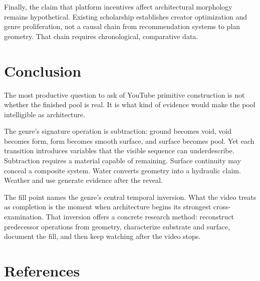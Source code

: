 \documentclass[11pt]{article}
\begin{document}
Finally, the claim that platform incentives affect architectural morphology remains hypothetical. Existing scholarship establishes creator optimization and genre proliferation, not a causal chain from recommendation systems to plan geometry. That chain requires chronological, comparative data.

\section{Conclusion}

The most productive question to ask of YouTube primitive construction is not whether the finished pool is real. It is what kind of evidence would make the pool intelligible as architecture.

The genre's signature operation is subtraction: ground becomes void, void becomes form, form becomes smooth surface, and surface becomes pool. Yet each transition introduces variables that the visible sequence can underdescribe. Subtraction requires a material capable of remaining. Surface continuity may conceal a composite system. Water converts geometry into a hydraulic claim. Weather and use generate evidence after the reveal.

The fill point names the genre's central temporal inversion. What the video treats as completion is the moment when architecture begins its strongest cross-examination. That inversion offers a concrete research method: reconstruct predecessor operations from geometry, characterize substrate and surface, document the fill, and then keep watching after the video stops.

\section*{References}
\end{document}
